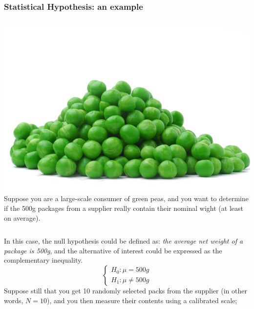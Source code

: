 \documentclass[10pt]{beamer}
\begin{document}
\begin{frame}
  \frametitle{Statistical Hypothesis: an example}
  {\small
    \begin{columns}
      \includegraphics[width=1\textwidth]{img/peas}
       Suppose you are a large-scale consumer of
      green peas, and you want to determine if the 500g packages from
      a supplier really contain their nominal wight (at least on
      average).
    \end{columns}
  }
  
  \bigskip
  
  In this case, the null hypothesis could be defined as: \emph{the
    average net weight of a package is 500g}, and the alternative of
  interest could be expressed as the complementary inequality.
  \begin{equation*}
    \begin{cases}
      H_0 : \mu = 500g\\
      H_1 : \mu \neq 500g
    \end{cases}
  \end{equation*}
  Suppose still that you get 10 randomly selected packs from the supplier
  (in other words, $N=10$), and you then measure their contents using
  a calibrated scale;
\end{frame}
\end{document}
